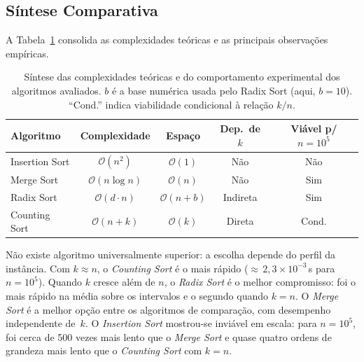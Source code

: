 \documentclass[12pt]{article}
\begin{document}
\subsection{Síntese Comparativa}
\label{subsec:sintese}

A Tabela~\ref{tab:sintese} consolida as complexidades teóricas e as
principais observações empíricas.

\begin{table}[!htbp]
  \centering
  \caption{Síntese das complexidades teóricas e do comportamento
           experimental dos algoritmos avaliados. $b$ é a base numérica
           usada pelo Radix Sort (aqui, $b = 10$).
           ``Cond.'' indica viabilidade condicional à relação $k/n$.}
  \label{tab:sintese}
  \begin{tabular}{lcccc}
    \toprule
    \textbf{Algoritmo} & \textbf{Complexidade} & \textbf{Espaço} &
    \textbf{Dep.\ de $k$} &
    \textbf{Viável p/ $n = 10^{5}$} \\
    \midrule
    Insertion Sort & $\mathcal{O}(n^{2})$    & $\mathcal{O}(1)$      & Não      & Não   \\
    Merge Sort     & $\mathcal{O}(n \log n)$ & $\mathcal{O}(n)$      & Não      & Sim   \\
    Radix Sort     & $\mathcal{O}(d \cdot n)$& $\mathcal{O}(n + b)$  & Indireta & Sim   \\
    Counting Sort  & $\mathcal{O}(n + k)$    & $\mathcal{O}(k)$      & Direta   & Cond. \\
    \bottomrule
  \end{tabular}
\end{table}

Não existe algoritmo universalmente superior: a escolha depende do perfil da
instância. Com $k \approx n$, o \textit{Counting Sort} é o mais
rápido (${\approx}\,2{,}3 \times 10^{-3}$\,s para $n = 10^{5}$). Quando $k$
cresce além de $n$, o \textit{Radix Sort} é o melhor compromisso: foi o mais
rápido na média sobre os intervalos e o segundo quando $k = n$. O
\textit{Merge Sort} é a melhor opção entre os algoritmos de comparação, com
desempenho independente de~$k$. O \textit{Insertion Sort} mostrou-se
inviável em escala: para $n = 10^{5}$, foi cerca de 500 vezes mais lento que
o \textit{Merge Sort} e quase quatro ordens de grandeza mais lento que o
\textit{Counting Sort} com $k = n$.

\end{document}
